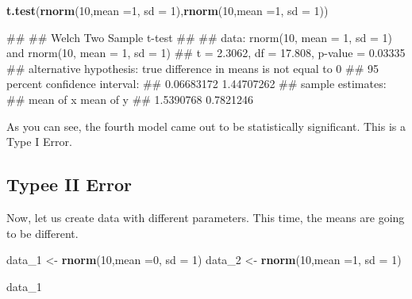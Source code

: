 \documentclass[
]{book}
\newenvironment{Shaded}{\begin{snugshade}}{\end{snugshade}}
\newcommand{\AttributeTok}[1]{\textcolor[rgb]{0.13,0.29,0.53}{#1}}
\newcommand{\DecValTok}[1]{\textcolor[rgb]{0.00,0.00,0.81}{#1}}
\newcommand{\FunctionTok}[1]{\textcolor[rgb]{0.13,0.29,0.53}{\textbf{#1}}}
\newcommand{\NormalTok}[1]{#1}
\newcommand{\OtherTok}[1]{\textcolor[rgb]{0.56,0.35,0.01}{#1}}
\begin{document}
\begin{Shaded}
\begin{Highlighting}[]
\FunctionTok{t.test}\NormalTok{(}\FunctionTok{rnorm}\NormalTok{(}\DecValTok{10}\NormalTok{,}\AttributeTok{mean =}\DecValTok{1}\NormalTok{, }\AttributeTok{sd =} \DecValTok{1}\NormalTok{),}\FunctionTok{rnorm}\NormalTok{(}\DecValTok{10}\NormalTok{,}\AttributeTok{mean =}\DecValTok{1}\NormalTok{, }\AttributeTok{sd =} \DecValTok{1}\NormalTok{))}
\end{Highlighting}
\end{Shaded}

\begin{Shaded}
\begin{Highlighting}[]
\NormalTok{\#\# }
\NormalTok{\#\#  Welch Two Sample t{-}test}
\NormalTok{\#\# }
\NormalTok{\#\# data:  rnorm(10, mean = 1, sd = 1) and rnorm(10, mean = 1, sd = 1)}
\NormalTok{\#\# t = 2.3062, df = 17.808, p{-}value = 0.03335}
\NormalTok{\#\# alternative hypothesis: true difference in means is not equal to 0}
\NormalTok{\#\# 95 percent confidence interval:}
\NormalTok{\#\#  0.06683172 1.44707262}
\NormalTok{\#\# sample estimates:}
\NormalTok{\#\# mean of x mean of y }
\NormalTok{\#\# 1.5390768 0.7821246}
\end{Highlighting}
\end{Shaded}

As you can see, the fourth model came out to be statistically significant. This is a Type I Error.

\subsection{Typee II Error}\label{typee-ii-error}

Now, let us create data with different parameters. This time, the means are going to be different.

\begin{Shaded}
\begin{Highlighting}[]
\NormalTok{data\_1 }\OtherTok{\textless{}{-}} \FunctionTok{rnorm}\NormalTok{(}\DecValTok{10}\NormalTok{,}\AttributeTok{mean =}\DecValTok{0}\NormalTok{, }\AttributeTok{sd =} \DecValTok{1}\NormalTok{)}
\NormalTok{data\_2 }\OtherTok{\textless{}{-}} \FunctionTok{rnorm}\NormalTok{(}\DecValTok{10}\NormalTok{,}\AttributeTok{mean =}\DecValTok{1}\NormalTok{, }\AttributeTok{sd =} \DecValTok{1}\NormalTok{)}

\NormalTok{data\_1}
\end{Highlighting}
\end{Shaded}
\end{document}
